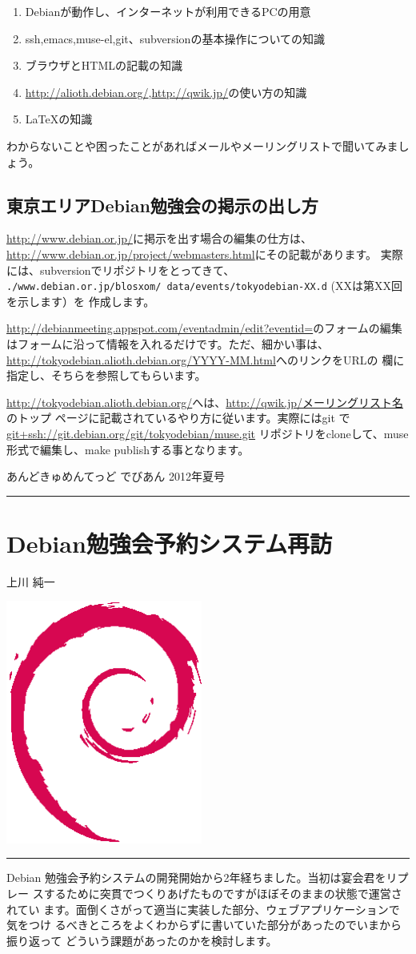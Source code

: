 \documentclass[mingoth,a4paper]{jsarticle}
\renewcommand{\dancersection}[2]{%
\newpage
あんどきゅめんてっど でびあん 2012年夏号
%
\vspace{0.1mm}\\
{\color{dancerdarkblue}\rule{\hsize}{2mm}}

%
%
\begin{minipage}[t]{0.6\hsize}
\color{dancerdarkblue}
\vspace{1cm}
\section{#1}
\hfill{}#2\\
\end{minipage}
\begin{minipage}[t]{0.4\hsize}
\vspace{-2cm}
\hfill{}\includegraphics[height=8cm]{image200502/openlogo-nd.eps}\\
\vspace{-5cm}
\end{minipage}
%
{\color{dancerlightblue}\rule{0.66\hsize}{2mm}}
%
\vspace{2cm}
}
\begin{document}
\begin{enumerate}
\item Debianが動作し、インターネットが利用できるPCの用意
\item ssh,emacs,muse-el,git、subversionの基本操作についての知識
\item ブラウザとHTMLの記載の知識
\item \url{http://alioth.debian.org/},\url{http://qwik.jp/}の使い方の知識
\item \LaTeX{}の知識
\end{enumerate}

わからないことや困ったことがあればメールやメーリングリストで聞いてみましょう。

\subsection{東京エリアDebian勉強会の掲示の出し方}

\url{http://www.debian.or.jp/}に掲示を出す場合の編集の仕方は、
\url{http://www.debian.or.jp/project/webmasters.html}にその記載があります。
実際には、subversionでリポジトリをとってきて、\\
\texttt{./www.debian.or.jp/blosxom/ data/events/tokyodebian-XX.d} (XXは第XX回を示します）を
作成します。

\url{http://debianmeeting.appspot.com/eventadmin/edit?eventid=}のフォームの編集
はフォームに沿って情報を入れるだけです。ただ、細かい事は、\url{http://tokyodebian.alioth.debian.org/YYYY-MM.html}へのリンクをURLの
欄に指定し、そちらを参照してもらいます。

\url{http://tokyodebian.alioth.debian.org/}へは、\url{http://qwik.jp/メーリングリスト名}のトップ
ページに記載されているやり方に従います。実際にはgit
で\url{git+ssh://git.debian.org/git/tokyodebian/muse.git} リポジトリをcloneして、muse形式で編集し、make publishする事となります。

\clearpage

\dancersection{Debian勉強会予約システム再訪}{上川 純一}

Debian 勉強会予約システムの開発開始から2年経ちました。当初は宴会君をリプレー
スするために突貫でつくりあげたものですがほぼそのままの状態で運営されてい
ます。面倒くさがって適当に実装した部分、ウェブアプリケーションで気をつけ
るべきところをよくわからずに書いていた部分があったのでいまから振り返って
どういう課題があったのかを検討します。
\end{document}
